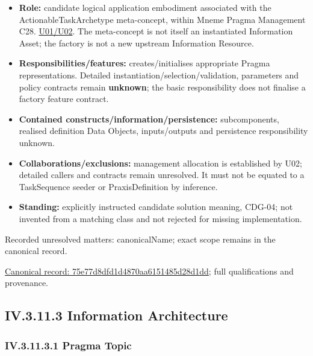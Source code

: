\begin{itemize}


\item \textbf{Role:} candidate logical application embodiment associated with the
  ActionableTaskArchetype meta-concept, within Mneme Pragma Management C28.
  \href{\detokenize{../../../../../docs/markdown/05-information-systems-architecture/sources.md#u02}}{U01/U02}. The meta-concept is not itself an instantiated
  Information Asset; the factory is not a new upstream Information Resource.

\item \textbf{Responsibilities/features:} creates/initialises appropriate Pragma
  representations. Detailed instantiation/selection/validation, parameters and
  policy contracts remain \textbf{unknown}; the basic responsibility does not finalise
  a factory feature contract.

\item \textbf{Contained constructs/information/persistence:} subcomponents, realised
  definition Data Objects, inputs/outputs and persistence responsibility unknown.

\item \textbf{Collaborations/exclusions:} management allocation is established by U02;
  detailed callers and contracts remain unresolved. It must not be equated to a
  TaskSequence seeder or PraxisDefinition by inference.

\item \textbf{Standing:} explicitly instructed candidate solution meaning, CDG-04; not
  invented from a matching class and not rejected for missing implementation.

\end{itemize}

{\small Recorded unresolved matters: canonicalName; exact scope remains in the canonical record.}\par
{\footnotesize \href{../../../../continuum/application/application-component/75e77d8dfd1d4870aa6151485d28d1dd.md}{Canonical record: 75e77d8dfd1d4870aa6151485d28d1dd}; full qualifications and provenance.}\par
\subsection*{IV.3.11.3 Information Architecture}
\label{navigation:IV.3.11.3}

\subsubsection*{IV.3.11.3.1 Pragma Topic}
\label{navigation:IV.3.11.3.1}

